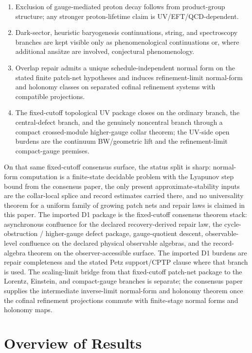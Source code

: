 \documentclass[11pt]{article}
\begin{document}
\begin{enumerate}[leftmargin=2em]
\item Exclusion of gauge-mediated proton decay follows from product-group structure; any stronger proton-lifetime claim is UV/EFT/QCD-dependent.
\item Dark-sector, heuristic baryogenesis continuations, string, and spectroscopy branches are kept visible only as phenomenological continuations or, where additional ans\"atze are involved, conjectural phenomenology.
\item Overlap repair admits a unique schedule-independent normal form on the stated finite patch-net hypotheses and induces refinement-limit normal-form and holonomy classes on separated cofinal refinement systems with compatible projections.
\item The fixed-cutoff topological UV package closes on the ordinary branch, the central-defect branch, and the genuinely noncentral branch through a compact crossed-module higher-gauge collar theorem; the UV-side open burdens are the continuum BW/geometric lift and the refinement-limit compact-gauge premises.
\end{enumerate}

On that same fixed-cutoff consensus surface, the status split is sharp: normal-form computation is
a finite-state decidable problem with the Lyapunov step bound from the consensus paper, the only
present approximate-stability inputs are the collar-local splice and record estimates carried
there, and no universality theorem for a uniform family of growing patch nets and repair laws is
claimed in this paper.
The imported D1 package is the fixed-cutoff consensus theorem stack: asynchronous confluence
for the declared recovery-derived repair law, the cycle-obstruction / higher-gauge defect package,
gauge-quotient descent, observable-level confluence on the declared physical observable algebras,
and the record-algebra theorem on the observer-accessible surface. The imported D1
burdens are repair completeness and the stated Petz support/CPTP clause where that branch is used.
The scaling-limit bridge from that fixed-cutoff patch-net package to the Lorentz, Einstein, and
compact-gauge branches is separate; the consensus paper supplies the intermediate inverse-limit
normal-form and holonomy theorem once the cofinal refinement projections commute with finite-stage
normal forms and holonomy maps.

\section{Overview of Results}
\end{document}
